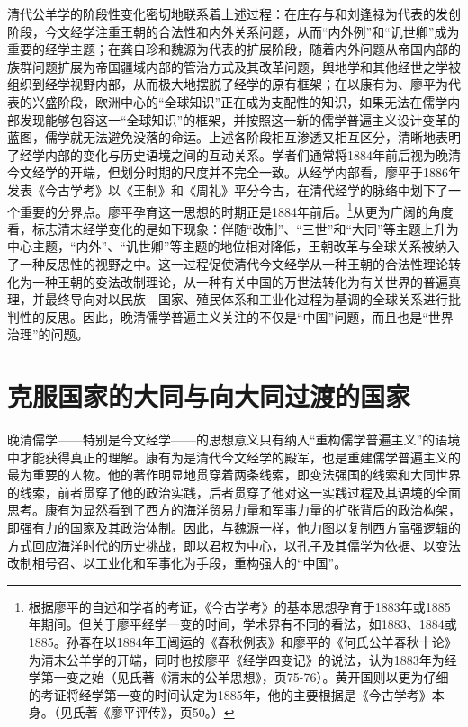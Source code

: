 \documentclass[a4paper, 12pt, openright]{ctexbook}
\begin{document}
清代公羊学的阶段性变化密切地联系着上述过程：在庄存与和刘逢禄为代表的发创阶段，今文经学注重王朝的合法性和内外关系问题，从而“内外例”和“讥世卿”成为重要的经学主题；在龚自珍和魏源为代表的扩展阶段，随着内外问题从帝国内部的族群问题扩展为帝国疆域内部的管治方式及其改革问题，舆地学和其他经世之学被组织到经学视野内部，从而极大地摆脱了经学的原有框架；在以康有为、廖平为代表的兴盛阶段，欧洲中心的“全球知识”正在成为支配性的知识，如果无法在儒学内部发现能够包容这一“全球知识”的框架，并按照这一新的儒学普遍主义设计变革的蓝图，儒学就无法避免没落的命运。上述各阶段相互渗透又相互区分，清晰地表明了经学内部的变化与历史语境之间的互动关系。学者们通常将1884年前后视为晚清今文经学的开端，但划分时期的尺度并不完全一致。从经学内部看，廖平于1886年发表《今古学考》以《王制》和《周礼》平分今古，在清代经学的脉络中划下了一个重要的分界点。廖平孕育这一思想的时期正是1884年前后。\footnote{根据廖平的自述和学者的考证，《今古学考》的基本思想孕育于1883年或1885年期间。但关于廖平经学一变的时间，学术界有不同的看法，如1883、1884或1885。孙春在以1884年王闿运的《春秋例表》和廖平的《何氏公羊春秋十论》为清末公羊学的开端，同时也按廖平《经学四变记》的说法，认为1883年为经学第一变之始（见氏著《清末的公羊思想》，页75-76）。黄开国则以更为仔细的考证将经学第一变的时间认定为1885年，他的主要根据是《今古学考》本身。（见氏著《廖平评传》，页50。）}从更为广阔的角度看，标志清末经学变化的是如下现象：伴随“改制”、“三世”和“大同”等主题上升为中心主题，“内外”、“讥世卿”等主题的地位相对降低，王朝改革与全球关系被纳入了一种反思性的视野之中。这一过程促使清代今文经学从一种王朝的合法性理论转化为一种王朝的变法改制理论，从一种有关中国的万世法转化为有关世界的普遍真理，并最终导向对以民族—国家、殖民体系和工业化过程为基调的全球关系进行批判性的反思。因此，晚清儒学普遍主义关注的不仅是“中国”问题，而且也是“世界治理”的问题。

\section{克服国家的大同与向大同过渡的国家}

晚清儒学——特别是今文经学——的思想意义只有纳入“重构儒学普遍主义”的语境中才能获得真正的理解。康有为是清代今文经学的殿军，也是重建儒学普遍主义的最为重要的人物。他的著作明显地贯穿着两条线索，即变法强国的线索和大同世界的线索，前者贯穿了他的政治实践，后者贯穿了他对这一实践过程及其语境的全面思考。康有为显然看到了西方的海洋贸易力量和军事力量的扩张背后的政治构架，即强有力的国家及其政治体制。因此，与魏源一样，他力图以复制西方富强逻辑的方式回应海洋时代的历史挑战，即以君权为中心，以孔子及其儒学为依据、以变法改制相号召、以工业化和军事化为手段，重构强大的“中国”。
\end{document}
